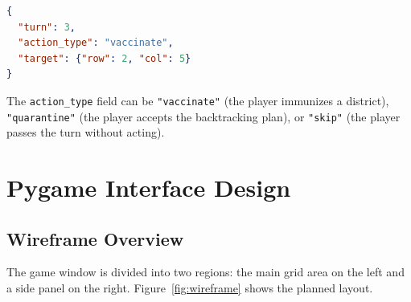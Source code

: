 \documentclass[conference]{IEEEtran}
\begin{document}
\begin{lstlisting}[language=json, frame=single,
  caption={Example \texttt{action.json}.},
  label={lst:action}]
{
  "turn": 3,
  "action_type": "vaccinate",
  "target": {"row": 2, "col": 5}
}
\end{lstlisting}

The \texttt{action\_type} field can be \texttt{"vaccinate"} (the player
immunizes a district), \texttt{"quarantine"} (the player accepts the
backtracking plan), or \texttt{"skip"} (the player passes the turn without
acting).

\section{Pygame Interface Design}

\subsection{Wireframe Overview}

The game window is divided into two regions: the main grid area on the left and
a side panel on the right. Figure~\ref{fig:wireframe} shows the planned layout.
\end{document}
